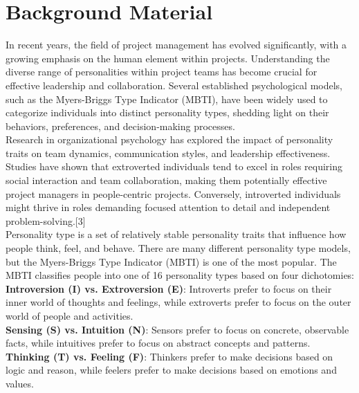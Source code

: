 \documentclass[a4Paper]{article}
\begin{document}
\pagebreak

\section{Background Material}

In recent years, the field of project management has evolved significantly, with a growing emphasis on the human element within projects. Understanding the diverse range of personalities within project teams has become crucial for effective leadership and collaboration. Several established psychological models, such as the Myers-Briggs Type Indicator (MBTI), have been widely used to categorize individuals into distinct personality types, shedding light on their behaviors, preferences, and decision-making processes.\\

Research in organizational psychology has explored the impact of personality traits on team dynamics, communication styles, and leadership effectiveness. Studies have shown that extroverted individuals tend to excel in roles requiring social interaction and team collaboration, making them potentially effective project managers in people-centric projects. Conversely, introverted individuals might thrive in roles demanding focused attention to detail and independent problem-solving.[3]\\

Personality type is a set of relatively stable personality traits that influence how people think, feel, and behave. There are many different personality type models, but the Myers-Briggs Type Indicator (MBTI) is one of the most popular. The MBTI classifies people into one of 16 personality types based on four dichotomies:\\

\textbf{Introversion (I) vs. Extroversion (E)}: Introverts prefer to focus on their inner world of thoughts and feelings, while extroverts prefer to focus on the outer world of people and activities.\\

\textbf{Sensing (S) vs. Intuition (N)}: Sensors prefer to focus on concrete, observable facts, while intuitives prefer to focus on abstract concepts and patterns.\\

\textbf{Thinking (T) vs. Feeling (F)}: Thinkers prefer to make decisions based on logic and reason, while feelers prefer to make decisions based on emotions and values.\\
\end{document}
